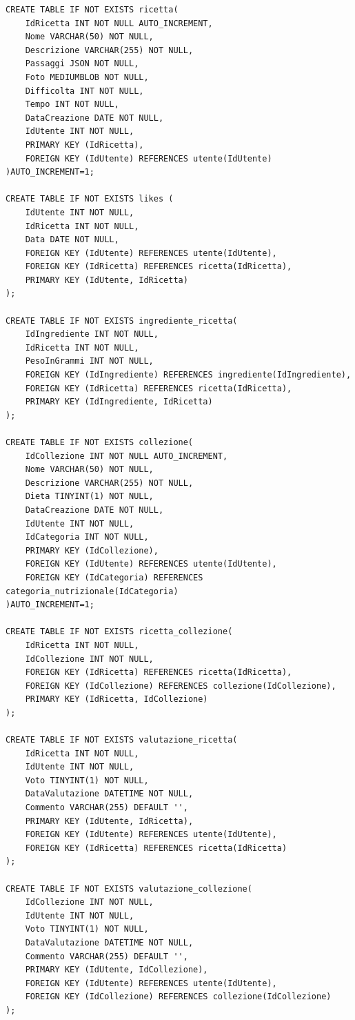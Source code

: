 ﻿\documentclass[a4paper,12pt]{report}
\begin{document}
\begin{verbatim}
CREATE TABLE IF NOT EXISTS ricetta(
    IdRicetta INT NOT NULL AUTO_INCREMENT,
    Nome VARCHAR(50) NOT NULL,
    Descrizione VARCHAR(255) NOT NULL,
    Passaggi JSON NOT NULL,
    Foto MEDIUMBLOB NOT NULL,
    Difficolta INT NOT NULL,
    Tempo INT NOT NULL,
    DataCreazione DATE NOT NULL,
    IdUtente INT NOT NULL,
    PRIMARY KEY (IdRicetta),
    FOREIGN KEY (IdUtente) REFERENCES utente(IdUtente)
)AUTO_INCREMENT=1;

CREATE TABLE IF NOT EXISTS likes (
	IdUtente INT NOT NULL,
	IdRicetta INT NOT NULL,
	Data DATE NOT NULL,
	FOREIGN KEY (IdUtente) REFERENCES utente(IdUtente),
	FOREIGN KEY (IdRicetta) REFERENCES ricetta(IdRicetta),
	PRIMARY KEY (IdUtente, IdRicetta)
);

CREATE TABLE IF NOT EXISTS ingrediente_ricetta(
    IdIngrediente INT NOT NULL,
    IdRicetta INT NOT NULL,
    PesoInGrammi INT NOT NULL,
    FOREIGN KEY (IdIngrediente) REFERENCES ingrediente(IdIngrediente),
    FOREIGN KEY (IdRicetta) REFERENCES ricetta(IdRicetta),
    PRIMARY KEY (IdIngrediente, IdRicetta)
);

CREATE TABLE IF NOT EXISTS collezione(
    IdCollezione INT NOT NULL AUTO_INCREMENT,
    Nome VARCHAR(50) NOT NULL,
    Descrizione VARCHAR(255) NOT NULL,
    Dieta TINYINT(1) NOT NULL,
    DataCreazione DATE NOT NULL,
    IdUtente INT NOT NULL,
    IdCategoria INT NOT NULL,
    PRIMARY KEY (IdCollezione),
    FOREIGN KEY (IdUtente) REFERENCES utente(IdUtente),
    FOREIGN KEY (IdCategoria) REFERENCES categoria_nutrizionale(IdCategoria)
)AUTO_INCREMENT=1;

CREATE TABLE IF NOT EXISTS ricetta_collezione(
    IdRicetta INT NOT NULL,
    IdCollezione INT NOT NULL,
    FOREIGN KEY (IdRicetta) REFERENCES ricetta(IdRicetta),
    FOREIGN KEY (IdCollezione) REFERENCES collezione(IdCollezione),
    PRIMARY KEY (IdRicetta, IdCollezione)
);

CREATE TABLE IF NOT EXISTS valutazione_ricetta(
    IdRicetta INT NOT NULL,
    IdUtente INT NOT NULL,
    Voto TINYINT(1) NOT NULL,
    DataValutazione DATETIME NOT NULL,
    Commento VARCHAR(255) DEFAULT '',
    PRIMARY KEY (IdUtente, IdRicetta),
    FOREIGN KEY (IdUtente) REFERENCES utente(IdUtente),
    FOREIGN KEY (IdRicetta) REFERENCES ricetta(IdRicetta)
);

CREATE TABLE IF NOT EXISTS valutazione_collezione(
    IdCollezione INT NOT NULL,
    IdUtente INT NOT NULL,
    Voto TINYINT(1) NOT NULL,
    DataValutazione DATETIME NOT NULL,
    Commento VARCHAR(255) DEFAULT '',
    PRIMARY KEY (IdUtente, IdCollezione),
    FOREIGN KEY (IdUtente) REFERENCES utente(IdUtente),
    FOREIGN KEY (IdCollezione) REFERENCES collezione(IdCollezione)
);


\end{verbatim}
\end{document}

